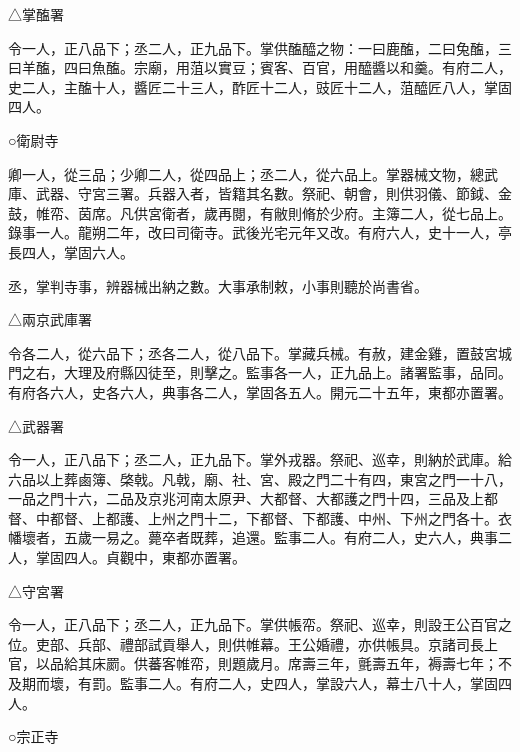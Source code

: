 \begin{pinyinscope}
 △掌醢署



 令一人，正八品下；丞二人，正九品下。掌供醢醯之物：一曰鹿醢，二曰兔醢，三曰羊醢，四曰魚醢。宗廟，用菹以實豆；賓客、百官，用醯醬以和羹。有府二人，史二人，主醢十人，醬匠二十三人，酢匠十二人，豉匠十二人，菹醯匠八人，掌固四人。



 ○衛尉寺



 卿一人，從三品；少卿二人，從四品上；丞二人，從六品上。掌器械文物，總武庫、武器、守宮三署。兵器入者，皆籍其名數。祭祀、朝會，則供羽儀、節鉞、金鼓，帷帟、茵席。凡供宮衛者，歲再閱，有敝則脩於少府。主簿二人，從七品上。錄事一人。龍朔二年，改曰司衛寺。武後光宅元年又改。有府六人，史十一人，亭長四人，掌固六人。



 丞，掌判寺事，辨器械出納之數。大事承制敕，小事則聽於尚書省。



 △兩京武庫署



 令各二人，從六品下；丞各二人，從八品下。掌藏兵械。有赦，建金雞，置鼓宮城門之右，大理及府縣囚徒至，則擊之。監事各一人，正九品上。諸署監事，品同。有府各六人，史各六人，典事各二人，掌固各五人。開元二十五年，東都亦置署。



 △武器署



 令一人，正八品下；丞二人，正九品下。掌外戎器。祭祀、巡幸，則納於武庫。給六品以上葬鹵簿、棨戟。凡戟，廟、社、宮、殿之門二十有四，東宮之門一十八，一品之門十六，二品及京兆河南太原尹、大都督、大都護之門十四，三品及上都督、中都督、上都護、上州之門十二，下都督、下都護、中州、下州之門各十。衣幡壞者，五歲一易之。薨卒者既葬，追還。監事二人。有府二人，史六人，典事二人，掌固四人。貞觀中，東都亦置署。



 △守宮署



 令一人，正八品下；丞二人，正九品下。掌供帳帟。祭祀、巡幸，則設王公百官之位。吏部、兵部、禮部試貢舉人，則供帷幕。王公婚禮，亦供帳具。京諸司長上官，以品給其床罽。供蕃客帷帟，則題歲月。席壽三年，氈壽五年，褥壽七年；不及期而壞，有罰。監事二人。有府二人，史四人，掌設六人，幕士八十人，掌固四人。



 ○宗正寺




\end{pinyinscope}
